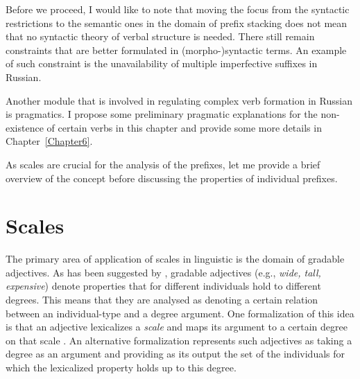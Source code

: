 
Before we proceed, I would like to note that moving the focus from the syntactic restrictions to the semantic ones in the domain of prefix stacking does not mean that no syntactic theory of verbal structure is needed. There still remain constraints that are better formulated in (morpho-)syntactic terms. An example of such constraint is the unavailability of multiple imperfective suffixes in Russian. 

Another module that is involved in regulating complex verb formation in Russian is pragmatics. I propose some preliminary pragmatic explanations for the non-existence of certain verbs in this chapter and provide some more details in Chapter~\ref{Chapter6}.

As scales are crucial for the analysis of the prefixes, let me provide a brief overview of the concept before discussing the properties of individual prefixes.

\section{Scales}


The primary area of application of scales in linguistic is the domain of gradable adjectives. As has been suggested by \citet{Kennedy:99}, gradable adjectives (e.g., \textit{wide, tall, expensive}) denote properties that for different individuals hold to different degrees. This means that they are analysed as denoting a certain relation between an individual-type and a degree argument. One formalization of this idea is that an adjective lexicalizes a \textit{scale} and maps its argument to a certain degree on that scale \citep{Kennedy:01, KennedyLevin:02}. An alternative formalization \citep[e.g.,][]{Heim:00} represents such adjectives as taking a degree as an argument and providing as its output the set of the individuals for which the lexicalized property holds up to this degree.

